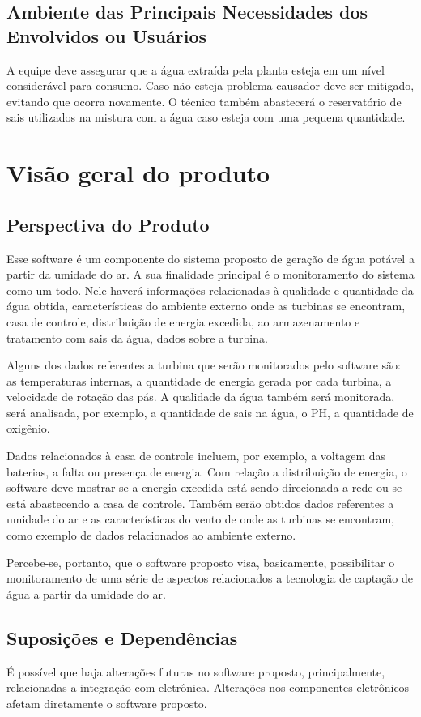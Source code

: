 \subsection*{Ambiente das Principais Necessidades dos Envolvidos ou Usuários}
A equipe deve assegurar que a água extraída pela planta esteja em um nível considerável para consumo. Caso não esteja problema causador deve ser mitigado, evitando que ocorra novamente. O técnico também abastecerá o reservatório de sais utilizados na mistura com a água caso esteja com uma pequena quantidade.

\section*{Visão geral do produto}
\subsection*{Perspectiva do Produto}
Esse software é um componente do sistema proposto de geração de água potável a partir da umidade do ar. A sua finalidade principal é o monitoramento do sistema como um todo. Nele haverá informações relacionadas à qualidade e quantidade da água obtida, características do ambiente externo onde as turbinas se encontram, casa de controle, distribuição de energia excedida, ao armazenamento e tratamento com sais da água, dados sobre a turbina. 

	Alguns dos dados referentes a turbina que serão monitorados pelo software são: as temperaturas internas, a quantidade de energia gerada por cada turbina, a velocidade de rotação das pás. A qualidade da água também será monitorada, será analisada, por exemplo, a quantidade de sais na água, o PH, a quantidade de oxigênio.
	
	Dados relacionados à casa de controle incluem, por exemplo, a voltagem das baterias, a falta ou presença de energia. Com relação a distribuição de energia, o software deve mostrar se a energia excedida está sendo direcionada a rede ou se está abastecendo a casa de controle. Também serão obtidos dados referentes a umidade do ar e as características do vento de onde as turbinas se encontram, como exemplo de dados relacionados ao ambiente externo.
	
	Percebe-se, portanto, que o software proposto visa, basicamente, possibilitar o monitoramento de uma série de aspectos relacionados a tecnologia de captação de água a partir da umidade do ar.

\subsection*{Suposições e Dependências}
É possível que haja alterações futuras no software proposto, principalmente, relacionadas a integração com eletrônica. Alterações nos componentes eletrônicos afetam diretamente o software proposto.

